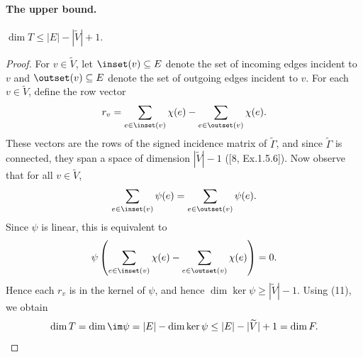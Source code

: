 \paragraph{The upper bound.}
\begin{lemma}$\dim T\le|E|-|\widetilde V|+1$.\end{lemma}
\begin{proof}
For $v\in\widetilde V$, let $\inset(v)\subseteq E$ denote the set of incoming edges incident to $v$ and $\outset(v)\subseteq E$ denote the set of outgoing edges incident to $v$. For each $v\in\widetilde V$, define the row vector
\[r_v=\sum_{e\in\inset(v)}\chi(e)-\sum_{e\in\outset(v)}\chi(e).\]
These vectors are the rows of the signed incidence matrix of $\widetilde\Gamma$, and since $\widetilde\Gamma$ is connected, they span a space of dimension $|\widetilde V|-1$ ([8, Ex.1.5.6]). Now observe that for all $v\in\widetilde V$,
\[\sum_{e\in\inset(v)}\psi(e)=\sum_{e\in\outset(v)}\psi(e).\]
Since $\psi$ is linear, this is equivalent to
\[\psi\left(\sum_{e\in\inset(v)}\chi(e)-\sum_{e\in\outset(v)}\chi(e)\right)=0.\]
Hence each $r_v$ is in the kernel of $\psi$, and hence $\dim\ker\psi\ge|\widetilde V|-1$. Using (11), we obtain
\[\dim T=\dim\im\psi=|E|-\dim\ker\psi\le|E|-|\widetilde V|+1=\dim F.\]
\end{proof}
